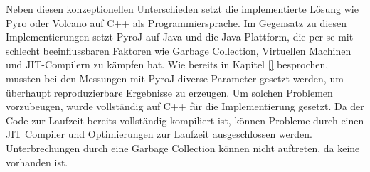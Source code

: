 Neben diesen konzeptionellen Unterschieden setzt die implementierte Lösung wie Pyro oder Volcano auf C++ als Programmiersprache. Im Gegensatz zu diesen Implementierungen setzt PyroJ auf Java und die Java Plattform, die per se mit schlecht beeinflussbaren Faktoren wie Garbage Collection, Virtuellen Machinen und JIT-Compilern zu kämpfen hat. Wie bereits in Kapitel \ref{} besprochen, mussten bei den Messungen mit PyroJ diverse Parameter gesetzt werden, um überhaupt reproduzierbare Ergebnisse zu erzeugen. Um solchen Problemen vorzubeugen, wurde vollständig auf C++ für die Implementierung gesetzt. Da der Code zur Laufzeit bereits vollständig kompiliert ist, können Probleme durch einen JIT Compiler und Optimierungen zur Laufzeit ausgeschlossen werden. Unterbrechungen durch eine Garbage Collection können nicht auftreten, da keine vorhanden ist.